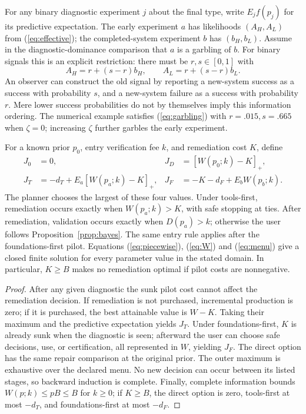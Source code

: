 For any binary diagnostic experiment $j$ about the final type, write $E_j f(p_j)$ for its predictive expectation. The early experiment $a$ has likelihoods $(A_H,A_L)$ from (\ref{eq:effective}); the completed-system experiment $b$ has $(b_H,b_L)$. Assume in the diagnostic-dominance comparison that $a$ is a garbling of $b$. For binary signals this is an explicit restriction: there must be $r,s\in[0,1]$ with
\begin{equation}
 A_H=r+(s-r)b_H,\qquad A_L=r+(s-r)b_L.\label{eq:garbling}
\end{equation}
An observer can construct the old signal by reporting a new-system success as a success with probability $s$, and a new-system failure as a success with probability $r$. Mere lower success probabilities do not by themselves imply this information ordering. The numerical example satisfies (\ref{eq:garbling}) with $r=.015,s=.665$ when $\zeta=0$; increasing $\zeta$ further garbles the early experiment.

\begin{proposition}\label{prop:joint}
For a known prior $p_0$, entry verification fee $k$, and remediation cost $K$, define
\begin{align}
 J_0&=0, & J_D&=[W(p_0;k)-K]_+,\\
 J_T&=-d_T+E_a[W(p_a;k)-K]_+, &
 J_F&=-K-d_F+E_bW(p_b;k).\label{eq:menu}
\end{align}
The planner chooses the largest of these four values. Under tools-first, remediation occurs exactly when $W(p_a;k)>K$, with safe stopping at ties. After remediation, validation occurs exactly when $D(p_a)>k$; otherwise the user follows Proposition~\ref{prop:bayes}. The same entry rule applies after the foundations-first pilot. Equations (\ref{eq:piecewise}), (\ref{eq:W}) and (\ref{eq:menu}) give a closed finite solution for every parameter value in the stated domain. In particular, $K\geq B$ makes no remediation optimal if pilot costs are nonnegative.
\end{proposition}
\begin{proof}
After any given diagnostic the sunk pilot cost cannot affect the remediation decision. If remediation is not purchased, incremental production is zero; if it is purchased, the best attainable value is $W-K$. Taking their maximum and the predictive expectation yields $J_T$. Under foundations-first, $K$ is already sunk when the diagnostic is seen; afterward the user can choose safe decisions, use, or certification, all represented in $W$, yielding $J_F$. The direct option has the same repair comparison at the original prior. The outer maximum is exhaustive over the declared menu. No new decision can occur between its listed stages, so backward induction is complete. Finally, complete information bounds $W(p;k)\leq pB\leq B$ for $k\geq0$; if $K\geq B$, the direct option is zero, tools-first at most $-d_T$, and foundations-first at most $-d_F$.
\end{proof}

